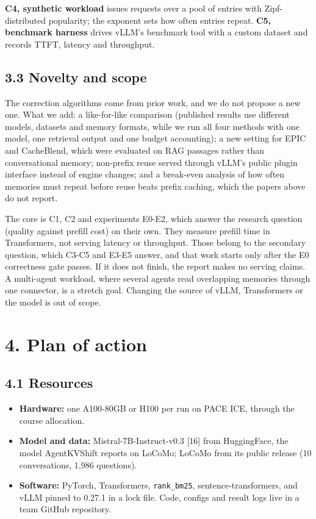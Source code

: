 \documentclass[
  10pt,
]{article}
\providecommand{\tightlist}{%
  \setlength{\itemsep}{0pt}\setlength{\parskip}{0pt}}
\begin{document}
\textbf{C4, synthetic workload} issues requests over a pool of entries
with Zipf-distributed popularity; the exponent sets how often entries
repeat. \textbf{C5, benchmark harness} drives vLLM's benchmark tool with
a custom dataset and records TTFT, latency and throughput.

\subsection{3.3 Novelty and scope}\label{novelty-and-scope}

The correction algorithms come from prior work, and we do not propose a
new one. What we add: a like-for-like comparison (published results use
different models, datasets and memory formats, while we run all four
methods with one model, one retrieval output and one budget accounting);
a new setting for EPIC and CacheBlend, which were evaluated on RAG
passages rather than conversational memory; non-prefix reuse served
through vLLM's public plugin interface instead of engine changes; and a
break-even analysis of how often memories must repeat before reuse beats
prefix caching, which the papers above do not report.

The core is C1, C2 and experiments E0-E2, which answer the research
question (quality against prefill cost) on their own. They measure
prefill time in Transformers, not serving latency or throughput. Those
belong to the secondary question, which C3-C5 and E3-E5 answer, and
that work starts only after the E0 correctness gate passes. If it does
not finish, the report makes no serving claims. A multi-agent workload, where several agents
read overlapping memories through one connector, is a stretch goal.
Changing the source of vLLM, Transformers or the model is out of scope.

\section{4. Plan of action}\label{plan-of-action}

\subsection{4.1 Resources}\label{resources}

\begin{itemize}
\tightlist
\item
  \textbf{Hardware:} one A100-80GB or H100 per run on PACE ICE, through
  the course allocation.
\item
  \textbf{Model and data:} Mistral-7B-Instruct-v0.3 {[}16{]} from
  HuggingFace, the model AgentKVShift reports on LoCoMo; LoCoMo from its
  public release (10 conversations, 1,986 questions).
\item
  \textbf{Software:} PyTorch, Transformers, \texttt{rank\_bm25},
  sentence-transformers, and vLLM pinned to 0.27.1 in a lock file. Code, configs and result logs live in a team GitHub repository.
\end{itemize}
\end{document}
